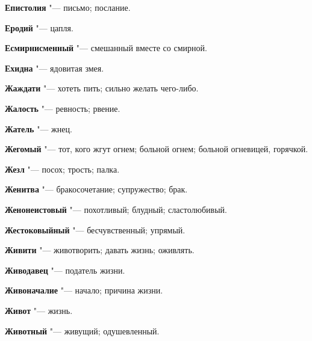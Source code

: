\begin{mymulticols}{2}
\noindent\textbf{Епистолия} "--- письмо; послание. 




\noindent\textbf{Еродий} "--- цапля. 




\noindent\textbf{Есмирнисменный} "--- смешанный вместе со смирной. 




\noindent\textbf{Ехидна} "--- ядовитая змея. 




\bukvaending






\noindent\textbf{Жаждати} "--- хотеть пить; сильно желать чего-либо. 




\noindent\textbf{Жалость} "--- ревность; рвение. 




\noindent\textbf{Жатель} "--- жнец. 




\noindent\textbf{Жегомый} "--- тот, кого жгут огнем; больной огнем; больной огневицей, горячкой. 




\noindent\textbf{Жезл} "--- посох; трость; палка. 




\noindent\textbf{Женитва} "--- бракосочетание; супружество; брак. 




\noindent\textbf{Женонеистовый} "--- похотливый; блудный; сластолюбивый. 




\noindent\textbf{Жестоковыйный} "--- бесчувственный; упрямый. 




\noindent\textbf{Живити} "--- животворить; давать жизнь; оживлять. 




\noindent\textbf{Живодавец} "--- податель жизни. 




\noindent\textbf{Живоначалие} "--- начало; причина жизни. 




\noindent\textbf{Живот} "--- жизнь. 




\noindent\textbf{Животный} "--- живущий; одушевленный. 





\end{mymulticols}
